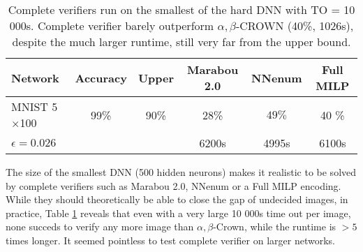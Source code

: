 \begin{table}[b!]
	\centering
	\begin{tabular}{||l|c|c||c|c|c||}
		\hline
		Network &  Accuracy & Upper  & Marabou 2.0 & NNenum &  Full MILP  \\ \hline
		MNIST 5$\times$100 & 99\% & 90\% & 28\% & $49\%$ & 40 \%    \\
		$\epsilon = 0.026$ & &  &6200s &  4995s & 6100s
		  \\  \hline
	\end{tabular}
\caption{Complete verifiers run on the smallest of the hard DNN with TO = 10 000s. 
Complete verifier barely outperform $\alpha,\beta$-CROWN (40\%, 1026s), despite the much larger runtime, 
still very far from the upper bound.}
\label{table_complete}
\end{table}



The size of the smallest DNN (500 hidden neurons) makes it realistic to be solved by complete verifiers such as Marabou 2.0, NNenum or a Full MILP encoding. 
While they should theoretically be able to close the gap of undecided images,
in practice, Table \ref{table_complete} reveals that even with a very large 10 000s time out per image, none succeds to verify any more image than $\alpha,\beta$-Crown, while the runtime is $>5$ times longer. It seemed pointless to test complete verifier on larger networks.









